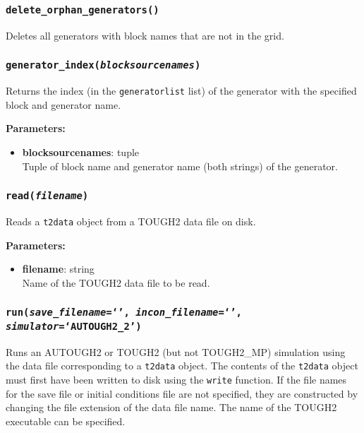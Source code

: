\subsubsection{\texttt{delete\_orphan\_generators()}}

Deletes all generators with block names that are not in the grid.

\subsubsection{\texttt{generator\_index(\emph{blocksourcenames})}}

Returns the index (in the \texttt{generatorlist} list) of the generator with the specified block and generator name.

\textbf{Parameters:}
\begin{itemize}
\item \textbf{blocksourcenames}: tuple\\
  Tuple of block name and generator name (both strings) of the generator.
\end{itemize}

\subsubsection{\texttt{read(\emph{filename})}}

Reads a \texttt{t2data} object from a TOUGH2 data file on disk.

\textbf{Parameters:}
\begin{itemize}
\item \textbf{filename}: string\\
  Name of the TOUGH2 data file to be read.
\end{itemize}

\subsubsection{\texttt{run(\emph{save\_filename}=`', \emph{incon\_filename}=`', \emph{simulator}=`AUTOUGH2\_2')}}

Runs an AUTOUGH2 or TOUGH2 (but not TOUGH2\_MP) simulation using the data file corresponding to a \texttt{t2data} object.  The contents of the \texttt{t2data} object must first have been written to disk using the \texttt{write} function.  If the file names for the save file or initial conditions file are not specified, they are constructed by changing the file extension of the data file name.  The name of the TOUGH2 executable can be specified.

